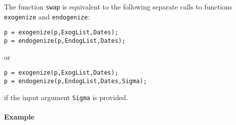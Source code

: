 The function \texttt{swap} is equivalent to the following separate calls
to functions \texttt{exogenize} and \texttt{endogenize}:

\begin{verbatim}
p = exogenize(p,ExogList,Dates);
p = endogenize(p,EndogList,Dates);
\end{verbatim}

or

\begin{verbatim}
p = exogenize(p,ExogList,Dates);
p = endogenize(p,EndogList,Dates,Sigma);
\end{verbatim}

if the input argument \texttt{Sigma} is provided.

\paragraph{Example}


